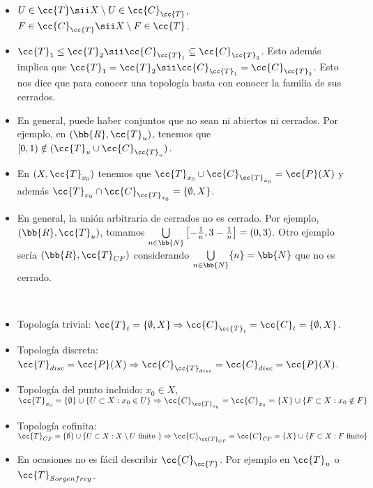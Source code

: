 \begin{observacion}\
    \begin{itemize}
        \item $U\in \cc{T}\sii X \setminus U \in \cc{C}_{\cc{T}}$, $F\in \cc{C}_{\cc{T}} \sii X\setminus F \in \cc{T}$.
        \item $\cc{T}_1 \leq \cc{T}_2\sii \cc{C}_{\cc{T}_1}\subseteq \cc{C}_{\cc{T}_2}$. Esto además implica que $\cc{T}_1=\cc{T}_2 \sii \cc{C}_{\cc{T}_1} = \cc{C}_{\cc{T}_2}$. Esto nos dice que para conocer una topología basta con conocer la familia de sus cerrados.
        \item En general, puede haber conjuntos que no sean ni abiertos ni cerrados. Por ejemplo, en $(\bb{R}, \cc{T}_u)$, tenemos que $[0,1)\notin (\cc{T}_u\cup \cc{C}_{\cc{T}_u})$.
        \item En $(X, \cc{T}_{x_0})$ tenemos que $\cc{T}_{x_0}\cup \cc{C}_{\cc{T}_{x_0}} = \cc{P}(X)$ y además $\cc{T}_{x_0}\cap \cc{C}_{\cc{T}_{x_0}}=\{\emptyset, X\}$.
        \item En general, la unión arbitraria de cerrados no es cerrado. Por ejemplo, $(\bb{R}, \cc{T}_u)$, tomamos $\bigcup\limits_{n\in \bb{N}}\left[-\frac{1}{n}, 3-\frac{1}{n}\right] = (0,3)$. Otro ejemplo sería $(\bb{R}, \cc{T}_{CF})$ considerando $\bigcup\limits_{n\in \bb{N}}\{n\}=\bb{N}$ que no es cerrado.
    \end{itemize}
    \endsquare
\end{observacion}
\begin{ejemplo}\
    \begin{itemize}
        \item Topología trivial: $\cc{T}_t=\{\emptyset, X\} \Rightarrow \cc{C}_{\cc{T}_t} = \cc{C}_t = \{\emptyset, X\}$.
        \item Topología discreta: $\cc{T}_{disc} = \cc{P}(X) \Rightarrow \cc{C}_{\cc{T}_{disc}} = \cc{C}_{disc} = \cc{P}(X)$.
        \item Topología del punto incluido: $x_0 \in X$, $\cc{T}_{x_0}=\{\emptyset\} \cup \{U\subset X : x_0 \in U\} \Rightarrow \cc{C}_{\cc{T}_{x_0}} = \cc{C}_{x_0} = \{X\}\cup \{F \subset X : x_0 \notin F\}$
        \item Topología cofinita: $\cc{T}_{CF} = \{\emptyset\}\cup \{U\subset X : X \setminus U \text{ finito }\} \Rightarrow \cc{C}_{\cc{T}_{CF}}=\cc{C}_{CF}=\{X\}\cup \{F\subset X : F \text{ finito}\}$
        \item En ocasiones no es fácil describir $\cc{C}_{\cc{T}}$. Por ejemplo en $\cc{T}_u$ o $\cc{T}_{Sorgenfrey}$.
    \end{itemize}
    \endsquare
\end{ejemplo}

